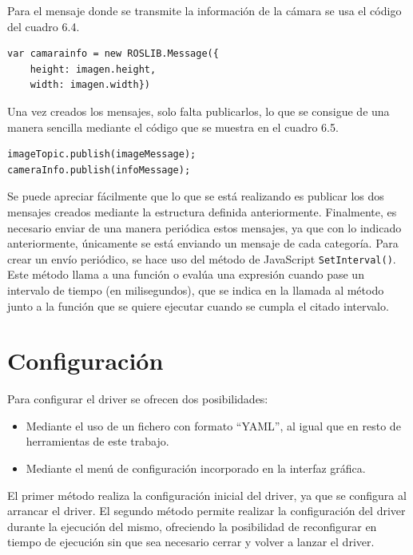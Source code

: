 Para el mensaje donde se transmite la información de la cámara se usa el código del cuadro 6.4.

\begin{lstlisting}[caption= Definición del mensaje para la información de la cámara, label=cod.definicionmensajeinfo]
var camarainfo = new ROSLIB.Message({
	height: imagen.height,
	width: imagen.width})

\end{lstlisting}
Una vez creados los mensajes, solo falta publicarlos, lo que se consigue de una manera sencilla mediante el código que se muestra en el cuadro 6.5.
\begin{lstlisting}[frame=single]
imageTopic.publish(imageMessage);
cameraInfo.publish(infoMessage);
\end{lstlisting}

Se puede apreciar fácilmente que lo que se está realizando es publicar los dos mensajes creados mediante la estructura definida anteriormente. 
Finalmente, es necesario enviar de una manera periódica estos mensajes, ya que con lo indicado anteriormente, únicamente se está enviando un mensaje de cada categoría. 
Para crear un envío periódico, se hace uso del método de JavaScript \texttt{SetInterval()}. Este método llama a una función o evalúa una expresión cuando pase un intervalo de tiempo (en milisegundos), que se indica en la llamada al método junto a la función que se quiere ejecutar cuando se cumpla el citado intervalo.

\section{Configuración}
Para configurar el driver se ofrecen dos posibilidades:
\begin{itemize}
\item Mediante el uso de un fichero con formato ``YAML'', al igual que en resto de herramientas de este trabajo. 
\item Mediante el menú de configuración incorporado en la interfaz gráfica.
\end{itemize}
El primer método realiza la configuración inicial del driver, ya que se configura al arrancar el driver. El segundo método permite realizar la configuración del driver durante la ejecución del mismo, ofreciendo la posibilidad de reconfigurar en tiempo de ejecución sin que sea necesario cerrar y volver a lanzar el driver.


